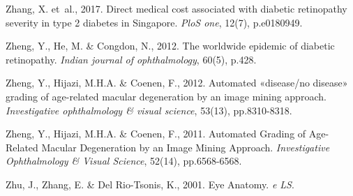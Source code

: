 \documentclass[
  12pt,
  spanish,
  a4paperpaper,
]{report}
\begin{document}
\leavevmode\hypertarget{ref-zhang2017direct}{}%
Zhang, X. et~al., 2017. Direct medical cost associated with diabetic
retinopathy severity in type 2 diabetes in Singapore. \emph{PloS one},
12(7), p.e0180949.

\leavevmode\hypertarget{ref-zheng2012worldwide}{}%
Zheng, Y., He, M. \& Congdon, N., 2012. The worldwide epidemic of
diabetic retinopathy. \emph{Indian journal of ophthalmology}, 60(5),
p.428.

\leavevmode\hypertarget{ref-zheng2012automated}{}%
Zheng, Y., Hijazi, M.H.A. \& Coenen, F., 2012. Automated «disease/no
disease» grading of age-related macular degeneration by an image mining
approach. \emph{Investigative ophthalmology \& visual science}, 53(13),
pp.8310-8318.

\leavevmode\hypertarget{ref-zheng2011automated}{}%
Zheng, Y., Hijazi, M.H.A. \& Coenen, F., 2011. Automated Grading of
Age-Related Macular Degeneration by an Image Mining Approach.
\emph{Investigative Ophthalmology \& Visual Science}, 52(14),
pp.6568-6568.

\leavevmode\hypertarget{ref-zhu2001eye}{}%
Zhu, J., Zhang, E. \& Del Rio-Tsonis, K., 2001. Eye Anatomy. \emph{e
LS}.
\end{document}

